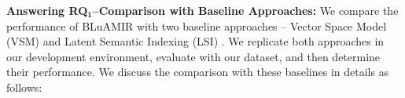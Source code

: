 \documentclass[conference]{IEEEtran}
\begin{document}




\textbf{Answering RQ$\mathbf{_1}$--Comparison with Baseline Approaches:}
We compare the performance of BLuAMIR with two baseline approaches -- Vector Space Model (VSM) \cite{vector-space-model} and Latent Semantic Indexing (LSI) \cite{MarcusLSI}. We replicate both approaches in our development environment, evaluate with our dataset, and then determine their performance. We discuss the comparison with these baselines in details as follows: 




\end{document}
